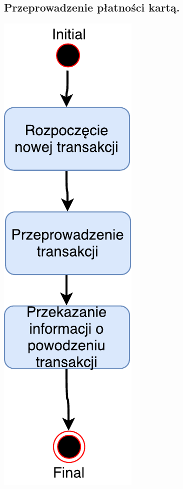 \documentclass[11pt]{article}
\begin{document}
		\subsection{Przeprowadzenie płatności kartą.}
		\begin{center}
			\includegraphics[scale=1.0]{czynnosci3.pdf}
		\end{center}
		\newpage
\end{document}
